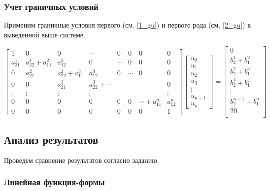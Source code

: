 \subsubsection{Учет граничных условий}

Применим граничные условия первого (см. \ref{1_gu}) и первого рода (см. \ref{2_gu}) к выведенной выше системе.

$$
\begin{bmatrix}
1 & 0 &   0 & \cdots & 0 & 0 & 0  & 0\\
a_{21}^1 & a_{22}^1+a_{11}^2 & a_{12}^2  & 0 & \cdots & 0 & 0  & 0\\
0 & a_{21}^2 & a_{22}^2+a_{11}^3  &  a_{12}^3  & 0 & \cdots & 0  & 0\\
0 & 0 & a_{21}^3  & a_{22}^3+ \cdots  &  & &   & 0\\
\vdots & \vdots & \vdots & \vdots &  &  &   & \vdots\\
0 & 0 & 0 & 0 &  0 & 0 & \cdots+a_{11}^n  & a_{12}^n\\
0 & 0 & 0 & 0 &  0 & 0 & 0 & 1
\end{bmatrix}
\begin{bmatrix}
u_0 \\
u_1 \\
u_2\\
u_3\\
\vdots\\
u_{n-1}\\
u_n
\end{bmatrix} =
\begin{bmatrix}
 0   \\
b_2^1+b_1^2\\
b_2^2+b_1^3\\
b_2^3+b_1^4\\
\vdots\\
b_2^{n-1}+b_1^n\\
 20   \\
\end{bmatrix}
$$

\subsection{Анализ результатов}

Проведем сравнение результатов согласно заданию.

\subsubsection{Линейная функция-формы}


